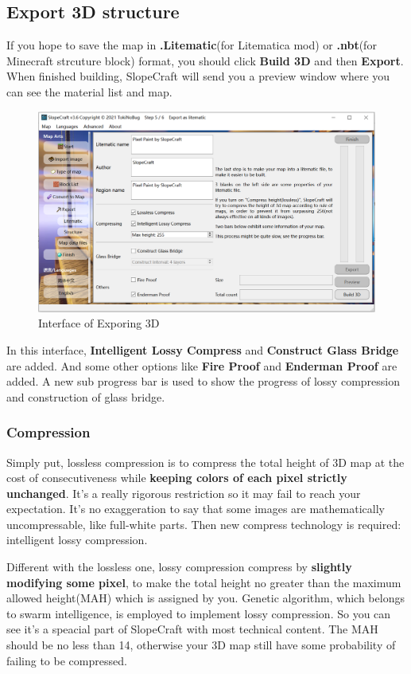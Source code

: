 \documentclass{article}
\begin{document}
    \subsection{Export 3D structure}
    If you hope to save the map in \textbf{.Litematic}(for Litematica mod) or \textbf{.nbt}(for Minecraft strcuture block) format, you should click \textbf{Build 3D} and then \textbf{Export}. When finished building, SlopeCraft will send you a preview window where you can see the material list and map.

    \begin{figure}[htbp]
        \centering
        \includegraphics[width=15cm]{Img2_Export3D.png}
        \caption{Interface of Exporing 3D}
    \end{figure}

    In this interface, \textbf{Intelligent Lossy Compress} and \textbf{Construct Glass Bridge} are added. And some other options like \textbf{Fire Proof} and \textbf{Enderman Proof} are added. A new sub progress bar is used to show the progress of lossy compression and construction of glass bridge.
        
    \subsubsection{Compression}
    Simply put, lossless compression is to compress the total height of 3D map at the cost of consecutiveness while \textbf{keeping colors of each pixel strictly unchanged}. It's a really rigorous restriction so it may fail to reach your expectation. It's no exaggeration to say that some images are mathematically uncompressable, like full-white parts. Then new compress technology is required: intelligent lossy compression.

    Different with the lossless one, lossy compression compress by \textbf{slightly modifying some pixel}, to make the total height no greater than the maximum allowed height(MAH) which is assigned by you. Genetic algorithm, which belongs to swarm intelligence, is employed to implement lossy compression. So you can see it's a speacial part of SlopeCraft with most technical content. The MAH should be no less than 14, otherwise your 3D map still have some probability of failing to be compressed.
\end{document}
